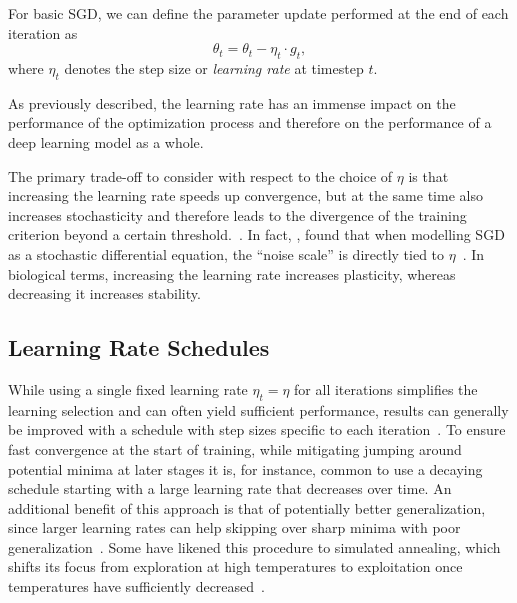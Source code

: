 \documentclass[letterpaper]{article} %
\begin{document}
For basic SGD, we can define the parameter update performed at the end of each iteration as
\begin{equation}
	\theta_{t}  = \theta_{t} - \eta_t \cdot g_t,
\end{equation}
where $\eta_t$ denotes the step size or \textit{learning rate} at timestep $t$.

As previously described, the learning rate has an immense impact on the performance of the optimization process and therefore on the performance of a deep learning model as a whole.

The primary trade-off to consider with respect to the choice of $\eta$ is that increasing the learning rate speeds up convergence, but at the same time also increases stochasticity and therefore leads to the divergence of the training criterion beyond a certain threshold.~\cite{bengioPracticalRecommendationsGradientbased2012}.
In fact, \citet{smithBayesianPerspectiveGeneralization2018}, found that when modelling SGD as a stochastic differential equation, the “noise scale” is directly tied to $\eta$~\cite{smithBayesianPerspectiveGeneralization2018}.
In biological terms, increasing the learning rate increases plasticity, whereas decreasing it increases stability.

\subsection{Learning Rate Schedules}

While using a single fixed learning rate $\eta_t = \eta$ for all iterations simplifies the learning selection and can often yield sufficient performance, results can generally be improved with a schedule with step sizes specific to each iteration~\cite{wuDemystifyingLearningRate2019b}.
To ensure fast convergence at the start of training, while mitigating jumping around potential minima at later stages it is, for instance, common to use a decaying schedule starting with a large learning rate that decreases over time.
An additional benefit of this approach is that of potentially better generalization, since larger learning rates can help skipping over sharp minima with poor generalization~\cite{hochreiterFlatMinima1997,chaudhariEntropySGDBiasingGradient2017}.
Some have likened this procedure to simulated annealing, which shifts its focus from exploration at high temperatures to exploitation once temperatures have sufficiently decreased~\cite{smithDonDecayLearning2018}.
\end{document}
